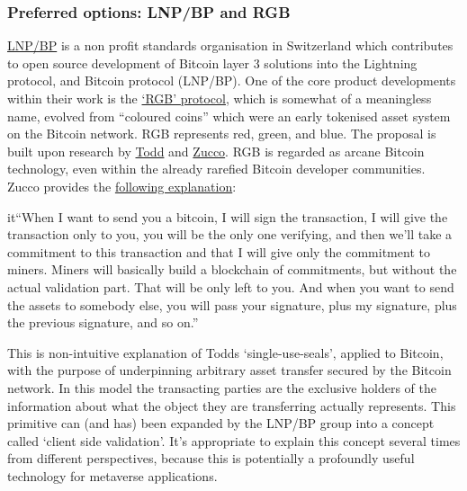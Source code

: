 \subsubsection{Preferred options: LNP/BP and RGB}
\href{https://giacomozucco.com/layers-before-bitcoin}{LNP/BP} is a non profit standards organisation in Switzerland which contributes to open source development of Bitcoin layer 3 solutions into the Lightning protocol, and Bitcoin protocol (LNP/BP). One of the core product developments within their work is the \href{https://www.rgb.tech/}{`RGB' protocol}, which is somewhat of a meaningless name, evolved from ``coloured coins'' which were an early tokenised asset system on the Bitcoin network. RGB represents red, green, and blue. The proposal is built upon research by \href{https://petertodd.org/2016/commitments-and-single-use-seals}{Todd} and \href{https://giacomozucco.com/#intro}{Zucco}. RGB is regarded as arcane Bitcoin technology, even within the already rarefied Bitcoin developer communities. Zucco provides the \href{https://bitcoinmagazine.com/culture/video-interview-giacomo-zucco-rgb-tokens-built-bitcoin}{following explanation}: \par
it{``When I want to send you a bitcoin, I will sign the transaction, I will give the transaction only to you, you will be the only one verifying, and then we’ll take a commitment to this transaction and that I will give only the commitment to miners. Miners will basically build a blockchain of commitments, but without the actual validation part. That will be only left to you. And when you want to send the assets to somebody else, you will pass your signature, plus my signature, plus the previous signature, and so on.''}\par
This is non-intuitive explanation of Todds `single-use-seals', applied to Bitcoin, with the purpose of underpinning arbitrary asset transfer secured by the Bitcoin network. In this model the transacting parties are the exclusive holders of the information about what the object they are transferring actually represents. This primitive can (and has) been expanded by the LNP/BP group into a concept called `client side validation'. 
It's appropriate to explain this concept several times from different perspectives, because this is potentially a profoundly useful technology for metaverse applications.\par
